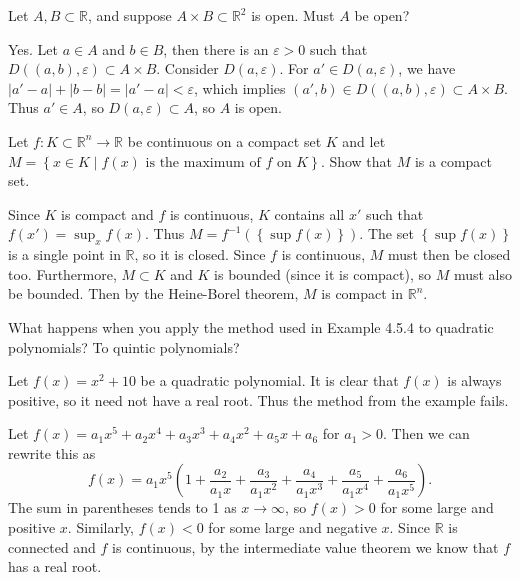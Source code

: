 \documentclass[10pt]{amsart}
\newenvironment{exercise}[1]{%
	\vspace{10mm}
	\renewcommand\themanualtheoreminner{#1}%
  \manualtheoreminner
}\hrulefill{\endmanualtheoreminner}
\begin{document}
\begin{exercise}{Page 184, 4.2.5}
	Let $A,B \subset \mathbb{R}$, and suppose $A \times B \subset \mathbb{R}^2$ is open. Must $A$ be open?
\end{exercise}

Yes. Let $a \in A$ and $b \in B$, then there is an $\varepsilon>0$ such that $D( (a,b),\varepsilon) \subset A \times B$. Consider $D(a,\varepsilon)$. For $a' \in D(a,\varepsilon)$, we have $|a'-a|+|b-b| = |a'-a| < \varepsilon$, which implies $(a',b) \in D( (a,b), \varepsilon) \subset A \times B$. Thus $a' \in A$, so $D(a,\varepsilon) \subset A$, so $A$ is open.

\begin{exercise}{Page 191, 4.4.3}
	Let $f:K\subset \mathbb{R}^n\to\mathbb{R}$ be continuous on a compact set $K$ and let $M=\left\{ x\in K \;|\; f(x) \text{ is the maximum of } f \text{ on } K\right\}$. Show that $M$ is a compact set.
\end{exercise}

Since $K$ is compact and $f$ is continuous, $K$ contains all $x'$ such that $f(x') = \sup_x f(x)$. Thus $M = f^{-1}(\left\{ \sup f(x) \right\})$. The set $\left\{ \sup f(x) \right\}$ is a single point in $\mathbb{R}$, so it is closed. Since $f$ is continuous, $M$ must then be closed too. Furthermore, $M \subset K$ and $K$ is bounded (since it is compact), so $M$ must also be bounded. Then by the Heine-Borel theorem, $M$ is compact in $\mathbb{R}^n$.

\begin{exercise}{Page 193, 4.5.1}
	What happens when you apply the method used in Example 4.5.4 to quadratic polynomials? To quintic polynomials?
\end{exercise}

Let $f(x) = x^2 + 10$ be a quadratic polynomial. It is clear that $f(x)$ is always positive, so it need not have a real root. Thus the method from the example fails.

Let $f(x) = a_1x^5 + a_2x^4 + a_3x^3 + a_4x^2 + a_5x + a_6$ for $a_1>0$. Then we can rewrite this as
\[
	f(x) = a_1x^5 \left( 1+ \frac{a_2}{a_1x} + \frac{a_3}{a_1x^2} +\frac{a_4}{a_1x^3} +\frac{a_5}{a_1x^4} +\frac{a_6}{a_1x^5}  \right).
\] The sum in parentheses tends to 1 as $x \to \infty$, so $f(x)>0$ for some large and positive $x$. Similarly, $f(x) < 0$ for some large and negative $x$. Since $\mathbb{R}$ is connected and $f$ is continuous, by the intermediate value theorem we know that $f$ has a real root.
\end{document}
